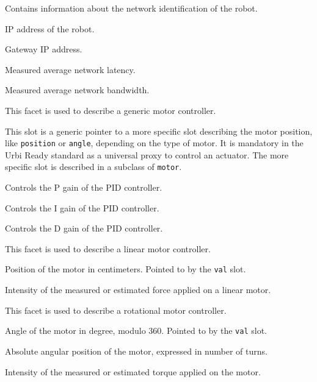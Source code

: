 
Contains information about the network identification of the robot.

\begin{slots}
  {%
    IP address of the robot.%
  }

  {%
    Gateway IP address.%
  }

  {%
    Measured average network latency.%
  }

  {%
    Measured average network bandwidth.%
  }

\end{slots}


This facet is used to describe a generic motor controller.

\begin{slots}
  {%
    This slot is a generic pointer to a more specific slot describing
    the motor position, like \texttt{position} or \texttt{angle},
    depending on the type of motor. It is mandatory in the Urbi Ready
    standard as a universal proxy to control an actuator. The more
    specific slot is described in a subclass of \texttt{motor}.%
  }

  {%
    Controls the P gain of the PID controller.%
  }

  {%
    Controls the I gain of the PID controller.%
  }

  {%
    Controls the D gain of the PID controller.%
  }

\end{slots}



This facet is used to describe a linear motor controller.

\begin{slots}
  {%
    Position of the motor in centimeters.  Pointed to by the
    \texttt{val} slot.%
  }

  {%
    Intensity of the measured or estimated force applied on a linear
    motor.%
  }

\end{slots}



This facet is used to describe a rotational motor controller.

\begin{slots}
  {%
    Angle of the motor in degree, modulo 360. Pointed to by the
    \texttt{val} slot.%
  }

  {%
    Absolute angular position of the motor, expressed in number of
    turns.%
  }

  {%
    Intensity of the measured or estimated torque applied on the
    motor.%
  }

\end{slots}


